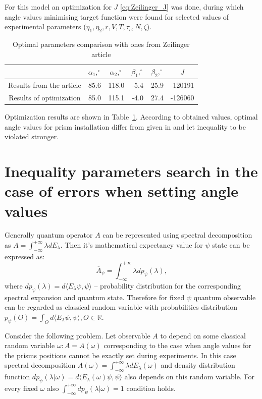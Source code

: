 \documentclass[11pt]{article}
\begin{document}
For this model an optimization for $J$ \eqref{eq:Zeilinger_J} was done, during which angle values 
minimising target function were found for selected values of experimental parameters 
($\eta_1, \eta_2, r, V, T, \tau_c, N, \zeta$).

\begin{table}
\begin{tabular}{|c|c|c|c|c|c|}
\hline 
 & $\alpha_1, ^\circ$ & $\alpha_2, ^\circ$ & $\beta_1, ^\circ$ & $\beta_2, ^\circ$ & $J$ \\ 
\hline 
Results from the article & 85.6 & 118.0 & -5.4 & 25.9 & -120191 \\ 
\hline 
Results of optimization & 85.0 & 115.1 & -4.0 & 27.4 & -126060 \\ 
\hline 
\end{tabular}
\caption{Optimal parameters comparison with ones from Zeilinger article \cite{Zeilinger}}
\label{tab:Zeilinger_parameters}
\end{table}

Optimization results are shown in Table~\ref{tab:Zeilinger_parameters}. According to obtained values, 
optimal angle values for prism installation differ from given in \cite{Zeilinger} and let inequality to be 
violated stronger.

\section{Inequality parameters search in the case of errors when setting angle values}
Generally quantum operator $A$ can be represented using spectral decomposition as 
$A = \int_{-\infty}^{+\infty}\lambda dE_\lambda$. Then it's mathematical expectancy value for $\psi$ 
state can be expressed as:
\[
\overline{A}_\psi = \int_{-\infty}^{+\infty}\lambda dp_\psi (\lambda),
\]
where $dp_\psi (\lambda) = d\langle E_\lambda\psi, \psi\rangle$ -- probability distribution for the 
corresponding spectral expansion and quantum state. Therefore for fixed $\psi$ quantum observable 
can be regarded as classical random variable with probabilities distribution
$p_\psi (O) = \int_O d\langle E_\lambda\psi, \psi\rangle, O\in \mathbb{R}$.

Consider the following problem. Let observable $A$ to depend on some classical random variable 
$\omega: A = A(\omega)$ corresponding to the case when angle values for the prisms positions 
cannot be exactly set during experiments. In this case spectral decomposition 
$A(\omega) = \int_{-\infty}^{+\infty}\lambda dE_\lambda(\omega)$ and density distribution function 
$dp_\psi (\lambda|\omega) = d\langle E_\lambda(\omega)\psi, \psi\rangle$ also depends on 
this random variable. For every fixed $\omega$ also 
$\int_{-\infty}^{+\infty}dp_\psi (\lambda|\omega) = 1$ condition holds.
\end{document}
